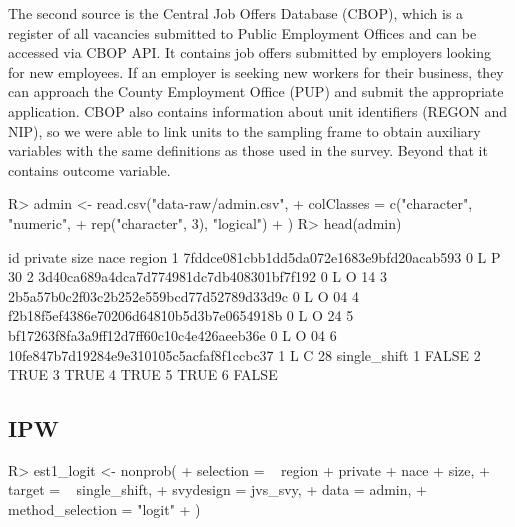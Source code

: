 \documentclass[
]{jss}
\begin{document}
The second source is the Central Job Offers Database (CBOP), which is a
register of all vacancies submitted to Public Employment Offices and can
be accessed via CBOP API. It contains job offers submitted by employers
looking for new employees. If an employer is seeking new workers for
their business, they can approach the County Employment Office (PUP) and
submit the appropriate application. CBOP also contains information about
unit identifiers (REGON and NIP), so we were able to link units to the
sampling frame to obtain auxiliary variables with the same definitions
as those used in the survey. Beyond that it contains
 outcome variable.

\begin{CodeChunk}
\begin{CodeInput}
R> admin <- read.csv("data-raw/admin.csv",
+                  colClasses = c("character", "numeric",
+                                 rep("character", 3), "logical")
+                  )
R> head(admin)
\end{CodeInput}
\begin{CodeOutput}
                                        id private size nace region
1 7fddce081cbb1dd5da072e1683e9bfd20acab593       0    L    P     30
2 3d40ca689a4dca7d774981dc7db408301bf7f192       0    L    O     14
3 2b5a57b0c2f03c2b252e559bcd77d52789d33d9c       0    L    O     04
4 f2b18f5ef4386e70206d64810b5d3b7e0654918b       0    L    O     24
5 bf17263f8fa3a9ff12d7ff60c10c4e426aeeb36e       0    L    O     04
6 10fe847b7d19284e9e310105c5acfaf8f1ccbc37       1    L    C     28
  single_shift
1        FALSE
2         TRUE
3         TRUE
4         TRUE
5         TRUE
6        FALSE
\end{CodeOutput}
\end{CodeChunk}

\subsection{IPW}\label{ipw}

\begin{CodeChunk}
\begin{CodeInput}
R> est1_logit <- nonprob(
+   selection = ~ region + private + nace + size,
+   target = ~ single_shift,
+   svydesign = jvs_svy,
+   data = admin,
+   method_selection = "logit"
+ )
\end{CodeInput}
\end{CodeChunk}
\end{document}
